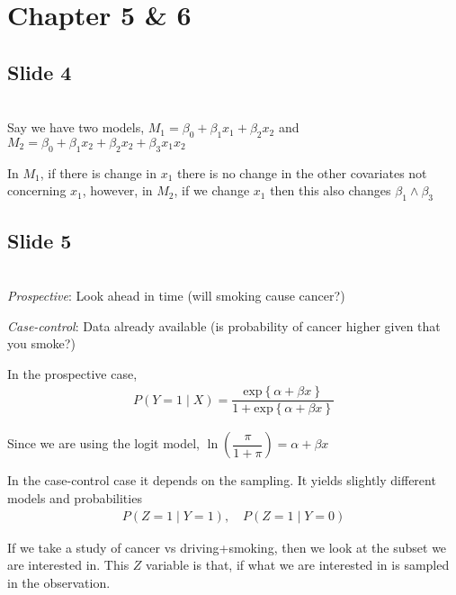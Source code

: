 \section{Chapter 5 \& 6}
\subsection{Slide 4}\hfill\\
\noindent Say we have two models, $M_1 = \beta_0+\beta_1x_1+\beta_2x_2$ and $M_2 = \beta_0+\beta_1x_2+\beta_2x_2+\beta_3x_1x_2$\par
\noindent In $M_1$, if there is change in $x_1$ there is no change in the other covariates not concerning $x_1$, however, in $M_2$, if we change $x_1$ then this also changes $\beta_1\wedge\beta_3$
\par\bigskip
\subsection{Slide 5}\hfill\\
\noindent \textit{Prospective}: Look ahead in time (will smoking cause cancer?)\par
\noindent\textit{Case-control}: Data already available (is probability of cancer higher given that you smoke?)
\par\bigskip
\noindent In the prospective case,
\begin{equation*}
  \begin{gathered}
    P(Y=1\mid X) = \dfrac{\text{exp}\left\{\alpha+\beta x\right\}}{1+\text{exp}\left\{\alpha+\beta x\right\}}
  \end{gathered}
\end{equation*}\par
\noindent Since we are using the logit model, $\ln{\left(\dfrac{\pi}{1+\pi}\right)} = \alpha+\beta x$\par
\noindent In the case-control case it depends on the sampling. It yields slightly different models and probabilities
\begin{equation*}
  \begin{gathered}
    P(Z=1\mid Y=1),\quad P(Z=1\mid Y=0)
  \end{gathered}
\end{equation*}\par
\noindent If we take a study of cancer vs driving+smoking, then we look at the subset we are interested in. This $Z$ variable is that, if what we are interested in is sampled in the observation.\par
